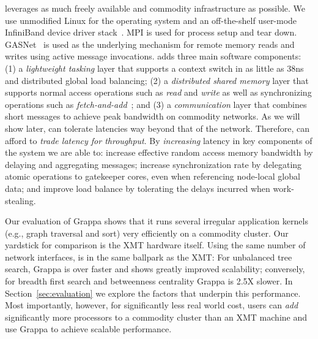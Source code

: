 \Grappa leverages as much freely available and commodity infrastructure as
possible. We use unmodified Linux for the operating system and an
off-the-shelf user-mode InfiniBand device driver stack~\cite{OFED}. MPI is
used for process setup and tear down. GASNet~\cite{gasnet} is used as the
underlying mechanism for remote memory reads and writes using active message
invocations. \Grappa adds three main software components: (1) a
\emph{lightweight tasking\/} layer that supports a context switch in as little
as 38ns and distributed global load balancing; (2) a \emph{distributed shared
memory\/} layer that supports normal access operations such as \emph{read\/}
and \emph{write\/} as well as synchronizing operations such as
\emph{fetch-and-add\/}~\cite{fetchandadd}; and (3) a \emph{communication\/}
layer that combines short messages to achieve peak bandwidth on commodity
networks. As we will show later, \Grappa can tolerate latencies way beyond
that of the network. Therefore, \Grappa can afford to \emph{trade latency for
throughput}. By {\em increasing\/} latency in key components of the system we
are able to: increase effective random access memory bandwidth by delaying and
aggregating messages; increase synchronization rate by delegating atomic
operations to gatekeeper cores, even when referencing node-local global data;
and improve load balance by tolerating the delays incurred when work-stealing.

Our evaluation of Grappa shows that it runs several irregular application
kernels (e.g., graph traversal and sort) very efficiently on a commodity
cluster. Our yardstick for comparison is the XMT hardware itself. Using the
same number of network interfaces, \Grappa is in the same ballpark as the XMT:
For unbalanced tree search, Grappa is over  faster and shows greatly
improved scalability; conversely, for breadth first search and betweenness
centrality Grappa is 2.5X slower. In Section~\ref{sec:evaluation} we explore
the factors that underpin this performance. Most importantly, however, for
significantly less real world cost, users can \emph{add\/} significantly more
processors to a commodity cluster than an XMT machine and use Grappa to
achieve scalable performance. 


